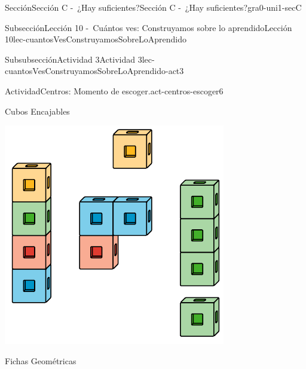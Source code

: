 \documentclass[twoside,10pt,]{article}
\begin{document}
\begin{sectionptx}{Sección}{Sección C -~¿Hay suficientes?}{}{Sección C -~¿Hay suficientes?}{}{}{gra0-uni1-secC}
\begin{subsectionptx}{Subsección}{Lección 10 -~Cuántos ves: Construyamos sobre lo aprendido}{}{Lección 10}{}{}{lec-cuantosVesConstruyamosSobreLoAprendido}
\begin{subsubsectionptx}{Subsubsección}{Actividad 3}{}{Actividad 3}{}{}{lec-cuantosVesConstruyamosSobreLoAprendido-act3}
\begin{activity}{Actividad}{Centros: Momento de escoger.}{act-centros-escoger6}
\begin{sidebyside}{2}{0.025}{0.025}{0.05}
\begin{sbspanel}{0.45}%
Cubos Encajables%
\par
\includegraphics[width=\linewidth]{external/svg-source/tikz-file-128850.pdf}
\end{sbspanel}%
\begin{sbspanel}{0.45}%
Fichas Geométricas%
\par

\end{sbspanel}
\end{sidebyside}
\end{activity}
\end{subsubsectionptx}
\end{subsectionptx}
\end{sectionptx}
\end{document}
